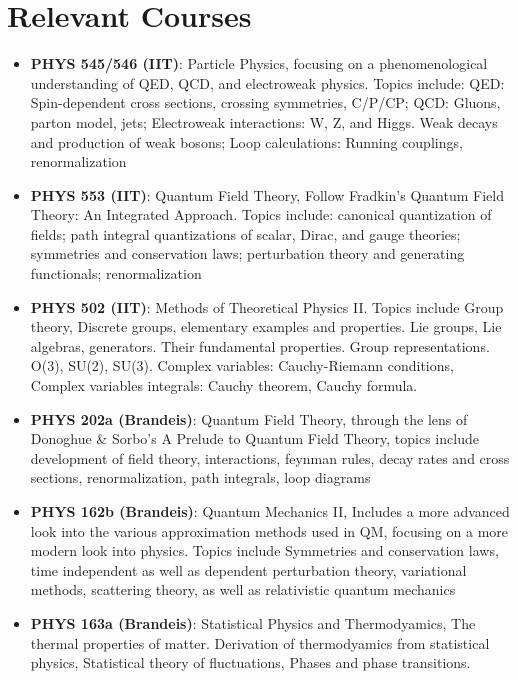 \documentclass[a4paper,20pt]{article}
\newcommand{\resumeItem}[2]{
  \item\small{
    \textbf{#1}{: #2 \vspace{-2pt}}
  }
}
\newcommand{\resumeSubItem}[2]{\resumeItem{#1}{#2}\vspace{-3pt}}
\newcommand{\resumeSubHeadingListStart}{\begin{itemize}[leftmargin=*]}
\newcommand{\resumeSubHeadingListEnd}{\end{itemize}}
\begin{document}
\section{Relevant Courses}
\resumeSubHeadingListStart
\resumeSubItem{PHYS 545/546 (IIT)}{Particle Physics, focusing on a phenomenological understanding of QED, QCD, and electroweak physics. Topics include: QED: Spin-dependent cross sections, crossing symmetries, C/P/CP; QCD: Gluons, parton model, jets; Electroweak interactions: W, Z, and Higgs. Weak decays and production of weak bosons; Loop calculations: Running couplings, renormalization}
\vspace{2pt}
\resumeSubItem{PHYS 553 (IIT)}{Quantum Field Theory, Follow Fradkin's Quantum Field Theory: An Integrated Approach. Topics include: canonical quantization of fields; path integral quantizations of scalar, Dirac, and gauge theories; symmetries and conservation laws; perturbation theory and generating functionals; renormalization}
\vspace{2pt}
\resumeSubItem{PHYS 502 (IIT)}{Methods of Theoretical Physics II. Topics include Group theory, Discrete groups, elementary examples and properties. Lie groups, Lie algebras, generators. Their fundamental properties. Group representations. O(3), SU(2), SU(3). Complex variables: Cauchy-Riemann conditions, Complex variables integrals: Cauchy theorem, Cauchy formula.}
\vspace{2pt}
\resumeSubItem{PHYS 202a (Brandeis)}{Quantum Field Theory, through the lens of Donoghue \& Sorbo's A Prelude to Quantum Field Theory, topics include development of field theory, interactions, feynman rules, decay rates and cross sections, renormalization, path integrals, loop diagrams}
\vspace{2pt}
\resumeSubItem{PHYS 162b (Brandeis)}{Quantum Mechanics II, Includes a more advanced look into the various approximation methods used in QM, focusing on a more modern look into physics. Topics include Symmetries and conservation laws, time independent as well as dependent perturbation theory, variational methods, scattering theory, as well as relativistic quantum mechanics}
\vspace{2pt}
\resumeSubItem{PHYS 163a (Brandeis)}{Statistical Physics and Thermodyamics, The thermal properties of matter. Derivation of thermodyamics from statistical physics, Statistical theory of fluctuations, Phases and phase transitions.}
\resumeSubHeadingListEnd
\vspace{-5pt}
\vspace{-5pt}
\end{document}
